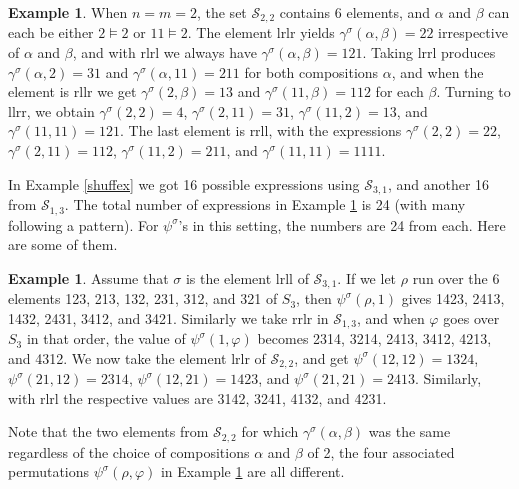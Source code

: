 \documentclass{article}
\theoremstyle{definition}
\newtheorem{ex}[thm]{Example}
\begin{document}
\begin{ex}
When $n=m=2$, the set $\mathcal{S}_{2,2}$ contains 6 elements, and $\alpha$ and $\beta$ can each be either $2\vDash2$ or $11\vDash2$. The element lrlr yields $\gamma^{\sigma}(\alpha,\beta)=22$ irrespective of $\alpha$ and $\beta$, and with rlrl we always have $\gamma^{\sigma}(\alpha,\beta)=121$. Taking lrrl produces $\gamma^{\sigma}(\alpha,2)=31$ and $\gamma^{\sigma}(\alpha,11)=211$ for both compositions $\alpha$, and when the element is rllr we get $\gamma^{\sigma}(2,\beta)=13$ and $\gamma^{\sigma}(11,\beta)=112$ for each $\beta$. Turning to llrr, we obtain $\gamma^{\sigma}(2,2)=4$, $\gamma^{\sigma}(2,11)=31$, $\gamma^{\sigma}(11,2)=13$, and $\gamma^{\sigma}(11,11)=121$. The last element is rrll, with the expressions $\gamma^{\sigma}(2,2)=22$, $\gamma^{\sigma}(2,11)=112$, $\gamma^{\sigma}(11,2)=211$, and $\gamma^{\sigma}(11,11)=1111$. \label{shuff22}
\end{ex}
In Example \ref{shuffex} we got 16 possible expressions using $\mathcal{S}_{3,1}$, and another 16 from $\mathcal{S}_{1,3}$. The total number of expressions in Example \ref{shuff22} is 24 (with many following a pattern). For $\psi^{\sigma}$'s in this setting, the numbers are 24 from each. Here are some of them.
\begin{ex}
Assume that $\sigma$ is the element lrll of $\mathcal{S}_{3,1}$. If we let $\rho$ run over the 6 elements 123, 213, 132, 231, 312, and 321 of $S_{3}$, then $\psi^{\sigma}(\rho,1)$ gives 1423, 2413, 1432, 2431, 3412, and 3421. Similarly we take rrlr in $\mathcal{S}_{1,3}$, and when $\varphi$ goes over $S_{3}$ in that order, the value of $\psi^{\sigma}(1,\varphi)$ becomes 2314, 3214, 2413, 3412, 4213, and 4312. We now take the element lrlr of $\mathcal{S}_{2,2}$, and get $\psi^{\sigma}(12,12)=1324$, $\psi^{\sigma}(21,12)=2314$, $\psi^{\sigma}(12,21)=1423$, and $\psi^{\sigma}(21,21)=2413$. Similarly, with rlrl the respective values are 3142, 3241, 4132, and 4231. \label{permsum4}
\end{ex}
Note that the two elements from $\mathcal{S}_{2,2}$ for which $\gamma^{\sigma}(\alpha,\beta)$ was the same regardless of the choice of compositions $\alpha$ and $\beta$ of 2, the four associated permutations $\psi^{\sigma}(\rho,\varphi)$ in Example \ref{permsum4} are all different.

\medskip
\end{document}
